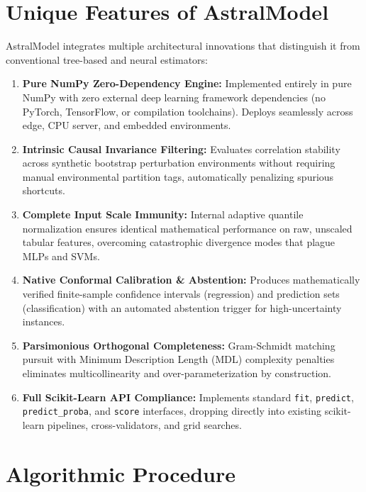 \documentclass[11pt,a4paper]{article}
\begin{document}
\section{Unique Features of AstralModel}

AstralModel integrates multiple architectural innovations that distinguish it from conventional tree-based and neural estimators:
\begin{enumerate}
    \item \textbf{Pure NumPy Zero-Dependency Engine:} Implemented entirely in pure NumPy with zero external deep learning framework dependencies (no PyTorch, TensorFlow, or compilation toolchains). Deploys seamlessly across edge, CPU server, and embedded environments.
    \item \textbf{Intrinsic Causal Invariance Filtering:} Evaluates correlation stability across synthetic bootstrap perturbation environments without requiring manual environmental partition tags, automatically penalizing spurious shortcuts.
    \item \textbf{Complete Input Scale Immunity:} Internal adaptive quantile normalization ensures identical mathematical performance on raw, unscaled tabular features, overcoming catastrophic divergence modes that plague MLPs and SVMs.
    \item \textbf{Native Conformal Calibration \& Abstention:} Produces mathematically verified finite-sample confidence intervals (regression) and prediction sets (classification) with an automated abstention trigger for high-uncertainty instances.
    \item \textbf{Parsimonious Orthogonal Completeness:} Gram-Schmidt matching pursuit with Minimum Description Length (MDL) complexity penalties eliminates multicollinearity and over-parameterization by construction.
    \item \textbf{Full Scikit-Learn API Compliance:} Implements standard \texttt{fit}, \texttt{predict}, \texttt{predict\_proba}, and \texttt{score} interfaces, dropping directly into existing scikit-learn pipelines, cross-validators, and grid searches.
\end{enumerate}

\section{Algorithmic Procedure}
\end{document}
